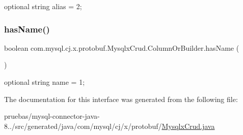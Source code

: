 {\ttfamily optional string alias = 2;} \mbox{\label{interfacecom_1_1mysql_1_1cj_1_1x_1_1protobuf_1_1_mysqlx_crud_1_1_column_or_builder_aa8143600edda62e2600f685253240a17}} 
\subsubsection{\texorpdfstring{has\+Name()}{hasName()}}
{\footnotesize\ttfamily boolean com.\+mysql.\+cj.\+x.\+protobuf.\+Mysqlx\+Crud.\+Column\+Or\+Builder.\+has\+Name (\begin{DoxyParamCaption}{ }\end{DoxyParamCaption})}

{\ttfamily optional string name = 1;} 

The documentation for this interface was generated from the following file\+:\begin{DoxyCompactItemize}
\item 
pruebas/mysql-\/connector-\/java-\/8../src/generated/java/com/mysql/cj/x/protobuf/\mbox{\hyperlink{_mysqlx_crud_8java}{Mysqlx\+Crud.\+java}}\end{DoxyCompactItemize}
